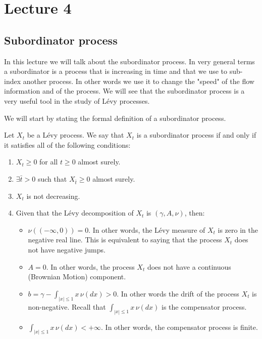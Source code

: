 \chapter{Lecture 4}

\section{Subordinator process}
In this lecture we will talk about the subordinator process. In very general 
terms a subordinator is a process that is increasing in time and that we use to
sub-index another process. In other words we use it to change the "speed" of the
flow information and of the process. We will see that the subordinator process
is a very useful tool in the study of L\'evy processes.

We will start by stating the formal definition of a subordinator process.

\begin{definition}
Let $X_t$ be a L\'evy process. We say that $X_t$ is a subordinator process if
and only if it satisfies all of the following conditions:

\begin{enumerate}[1)]
    \item $X_t \geq 0$ for all $t \geq 0$ almost surely.
    \item $\exists \bar{t} > 0$ such that $X_{\bar{t}} \geq 0$ almost surely.
    \item $X_t$ is not decreasing.
    \item Given that the L\'evy decomposition of $X_t$ is $(\gamma, A, \nu)$,
    then:
    \begin{itemize}
        \item $\nu((-\infty, 0)) = 0$. In other words, the L\'evy measure of
        $X_t$ is zero in the negative real line. This is equivalent to saying
        that the process $X_t$ does not have negative jumps.
        \item $A=0$. In other words, the process $X_t$ does not have a
        continuous (Brownian Motion) component.
        \item $b = \gamma - \int_{|x|\leq1} x \, \nu(dx) > 0$. In other words
        the drift of the process $X_t$ is non-negative. Recall that $\int_{
        |x|\leq1} x \, \nu(dx)$ is the compensator process.
        \item $\int_{|x|\leq 1} x \, \nu(dx) < + \infty$. In other words, the
        compensator process is finite.
    \end{itemize}
\end{enumerate}
\end{definition}

